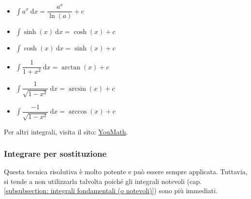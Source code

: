 \documentclass[a4paper]{article}
\begin{document}
\begin{itemize}
		\item $\displaystyle\int a^{x} \: \mathrm{d}x = \dfrac{a^{x}}{\ln\left(a\right)} + c$

		\item $\displaystyle\int \sinh\left(x\right) \: \mathrm{d}x = \cosh\left(x\right) + c$

		\item $\displaystyle\int \cosh\left(x\right) \: \mathrm{d}x = \sinh\left(x\right) + c$

		\item $\displaystyle\int \dfrac{1}{1+x^{2}} \: \mathrm{d}x = \arctan\left(x\right) + c$

		\item $\displaystyle\int \dfrac{1}{\sqrt{1-x^{2}}} \: \mathrm{d}x = \arcsin\left(x\right) + c$

		\item $\displaystyle\int \dfrac{-1}{\sqrt{1-x^{2}}} \: \mathrm{d}x = \arccos\left(x\right) + c$
	\end{itemize}
	Per altri integrali, visita il sito: \href{https://www.youmath.it/lezioni/analisi-matematica/integrali/596-integrali-notevoli.html}{YouMath}.\newpage

	\subsubsection{Integrare per sostituzione}\label{subsubsection: integrale per sostituzione}

	Questa tecnica risolutiva è molto potente e può essere sempre applicata. Tuttavia, si tende a non utilizzarla talvolta poiché gli integrali notevoli (cap. \ref{subsubsection: integrali fondamentali (o notevoli)}) sono più immediati.\newline
\end{document}
